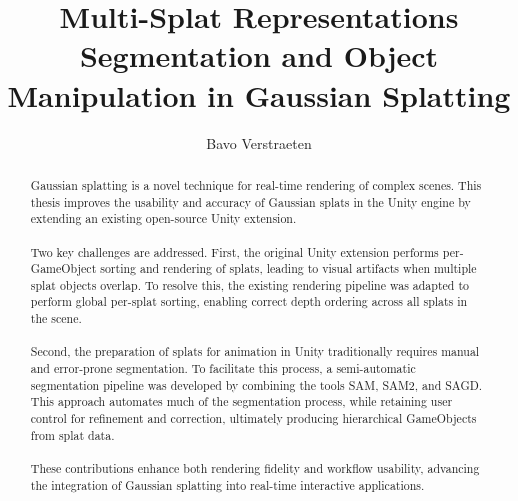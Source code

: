 \documentclass[12pt]{article}
\begin{document}
\begin{titlepage}
	\centering
	
	\title{Multi-Splat Representations \\ {\large Segmentation and Object Manipulation in Gaussian Splatting}}
	
	\author{Bavo Verstraeten}
	
	
	
	\maketitle
\end{titlepage}
	
\begin{abstract}
Gaussian splatting is a novel technique for real-time rendering of complex scenes. This thesis improves the usability and accuracy of Gaussian splats in the Unity engine by extending an existing open-source Unity extension.
\\\\
Two key challenges are addressed. First, the original Unity extension performs per-GameObject sorting and rendering of splats, leading to visual artifacts when multiple splat objects overlap. To resolve this, the existing rendering pipeline was adapted to perform global per-splat sorting, enabling correct depth ordering across all splats in the scene.
\\\\
Second, the preparation of splats for animation in Unity traditionally requires manual and error-prone segmentation. To facilitate this process, a semi-automatic segmentation pipeline was developed by combining the tools SAM, SAM2, and SAGD. This approach automates much of the segmentation process, while retaining user control for refinement and correction, ultimately producing hierarchical GameObjects from splat data.
\\\\
These contributions enhance both rendering fidelity and workflow usability, advancing the integration of Gaussian splatting into real-time interactive applications.

\end{abstract}

\begin{titlepage}
\centering
\tableofcontents
\end{titlepage}
\end{document}
